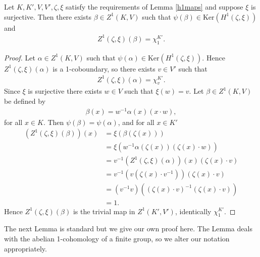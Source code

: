 \begin{lemma}\label{kerh1} Let $K, K', V, V', \zeta, \xi$ satisfy the requirements of Lemma \ref{h1maps} and suppose $\xi$ is surjective. 
Then there exists $\beta \in Z^1(K, V)$ such that $\psi(\beta) \in \mathrm{Ker}\left(H^1(\zeta, \xi)\right)$ and
\begin{align*}
	Z^1(\zeta, \xi)(\beta) = \chi^{K'}_1.
\end{align*}
\end{lemma}
\begin{proof}
	Let $\alpha \in Z^1(K, V)$ such that $\psi(\alpha) \in \mathrm{Ker}\left(H^1(\zeta, \xi)\right)$. Hence $Z^1(\zeta, \xi)(\alpha)$ is a 1-coboundary, so there exists $v \in V'$ such that
\begin{align*}
	Z^1(\zeta, \xi)(\alpha) = \chi^{K'}_v.
\end{align*}
Since $\xi$ is surjective there exists $w \in V$ such that $\xi(w) = v$.
Let $\beta \in Z^1(K, V)$ be defined by
\begin{align*}
	\beta(x) = w^{-1}\alpha(x)(x \cdot w),
\end{align*}
for all $x \in K$. Then $\psi(\beta) = \psi(\alpha)$, and for all $x \in K'$
\begin{align*}
	\left(Z^1(\zeta, \xi)(\beta)\right)(x) &= \xi\left(\beta(\zeta(x))\right) \\
		&= \xi\left(w^{-1}\alpha(\zeta(x))(\zeta(x)\cdot w )\right) \\
		&= v^{-1} \left(Z^1(\zeta, \xi)(\alpha)\right)(x) (\zeta(x) \cdot v ) \\
		&= v^{-1} \left(v(\zeta(x) \cdot v^{-1})\right) (\zeta(x) \cdot v ) \\
		&= (v^{-1} v) \left((\zeta(x) \cdot v)^{-1} (\zeta(x) \cdot v )\right) \\
		&= 1.
\end{align*}
	Hence $Z^1(\zeta, \xi)(\beta)$ is the trivial map in $Z^1(K', V')$, identically $\chi^{K'}_1$.
\end{proof}

The next Lemma is standard \cite[Theorem 10.3]{brown1976cohomology} but we give our own proof here. The Lemma deals with the abelian 1-cohomology of a finite group, so we alter our notation appropriately.

